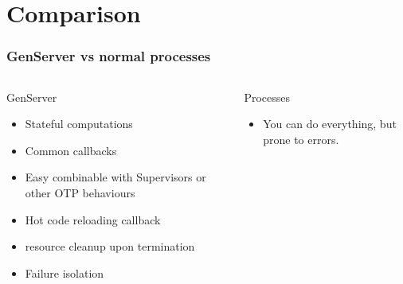 \section{Comparison}
\frame{\tableofcontents[currentsection]}

\begin{frame}
    \frametitle{GenServer vs normal processes}
    \begin{columns}
        \begin{column}[T]{0.5\textwidth}
            GenServer
            \vfill
            \begin{itemize}
                \small
                \item Stateful computations
                \item Common callbacks
                \item Easy combinable with Supervisors or other OTP behaviours
                \item Hot code reloading callback
                \item resource cleanup upon termination
                \item Failure isolation
            \end{itemize}
        \end{column}
        \begin{column}[T]{0.5\textwidth}
            Processes
            \begin{itemize}
                \item You can do everything, but prone to errors.
            \end{itemize}
        \end{column}
    \end{columns}
\end{frame}

